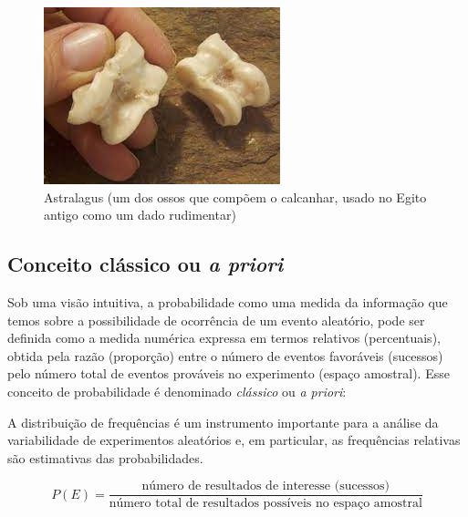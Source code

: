\documentclass[
]{book}
\begin{document}
\begin{figure}

{\centering \includegraphics[width=0.8\linewidth]{images4/astralagus} 

}

\caption{Astralagus (um dos ossos que compõem o calcanhar, usado no Egito antigo como um dado rudimentar)}\label{fig:unnamed-chunk-60}
\end{figure}

\hypertarget{conceito-cluxe1ssico-ou-a-priori}{%
\subsection{\texorpdfstring{Conceito clássico ou \emph{a priori}}{Conceito clássico ou a priori}}\label{conceito-cluxe1ssico-ou-a-priori}}

Sob uma visão intuitiva, a probabilidade como uma medida da informação que temos sobre a possibilidade de ocorrência de um evento aleatório, pode ser definida como a medida numérica expressa em termos relativos (percentuais), obtida pela razão (proporção) entre o número de eventos favoráveis (sucessos) pelo número total de eventos prováveis no experimento (espaço amostral). Esse conceito de probabilidade é denominado \emph{clássico} ou \emph{a priori}:

\hfill\break

A distribuição de frequências é um instrumento importante para a análise da variabilidade de experimentos aleatórios e, em particular, as frequências relativas são estimativas das probabilidades.

\hfill\break

\[
P(E)= \frac{\text{número de resultados de interesse (sucessos)}}{\text{número total de resultados possíveis no espaço amostral}}
\]
\end{document}
